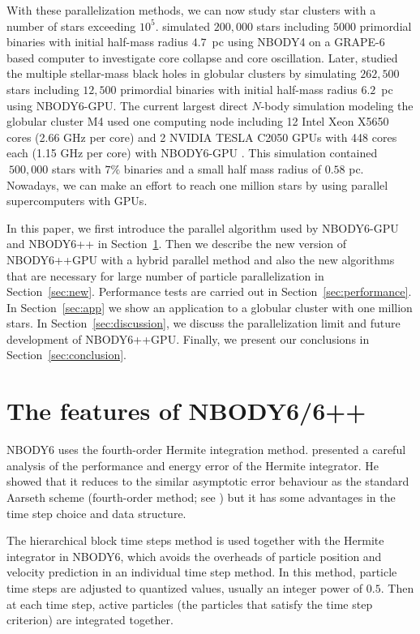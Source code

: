\documentclass[usenatbib,aas_macros]{mn2e}
\def\nbody{NBODY6 }
\def\nbodypp{NBODY6++ }
\def\nbodyppgpu{NBODY6++GPU }
\def\nbodygpu{NBODY6-GPU }
\def\nb{$N$-body }
\begin{document}
With these parallelization methods, we can now study star clusters with a number of stars exceeding $10^5$. 
\cite{Hurley2012} simulated $200,000$ stars including $5000$ primordial binaries with initial half-mass radius $4.7$~pc using NBODY4 on a GRAPE-6 based computer to investigate core collapse and core oscillation.  
Later, \cite{Sippel2013} studied the multiple stellar-mass black holes in globular clusters by simulating $262,500$ stars including $12,500$ primordial binaries with initial half-mass radius $6.2$~pc using NBODY6-GPU.
The current largest direct \nb simulation modeling the globular cluster M4 used one computing node including 12 Intel Xeon X5650 cores (2.66 GHz per core) and 2 NVIDIA TESLA C2050 GPUs with 448 cores each (1.15 GHz per core) with \nbodygpu \citep{Heggie2014}. 
This simulation contained $~500,000$ stars with $7\%$ binaries and a small half mass radius of $0.58$ pc. 
Nowadays, we can make an effort to reach one million stars by using parallel supercomputers with GPUs.

In this paper, we first introduce the parallel algorithm used by \nbodygpu and \nbodypp in Section~\ref{sec:feature}. 
Then we describe the new version of \nbodyppgpu with a hybrid parallel method and also the new algorithms that are necessary for large number of particle parallelization in Section~\ref{sec:new}. 
Performance tests are carried out in Section~\ref{sec:performance}.
In Section~\ref{sec:app} we show an application to a globular cluster with one million stars. 
In Section~\ref{sec:discussion}, we discuss the parallelization limit and future development of NBODY6++GPU. 
Finally, we present our conclusions in Section~\ref{sec:conclusion}.

\section{The features of NBODY6/6++}
\label{sec:feature}
\nbody uses the fourth-order Hermite integration method.
\cite{Makino1991} presented a careful analysis of the performance and energy error of the Hermite integrator. He showed that it reduces to the similar asymptotic error behaviour as the standard Aarseth scheme (fourth-order method; see \citealp{Aarseth1985}) but it has some advantages in the time step choice and data structure.

The hierarchical block time steps method is used together with the Hermite integrator \citep{McMillan1986,Makino1991} in NBODY6, 
which avoids the overheads of particle position and velocity prediction in an individual time step method. 
In this method, particle time steps are adjusted to quantized values, usually an integer power of $0.5$. 
Then at each time step, active particles (the particles that satisfy the time step criterion) are integrated together.
\end{document}
